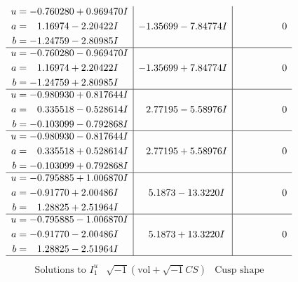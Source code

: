 \documentclass[1p]{elsarticle_modified}
\theoremstyle{definition}
\newcommand{\I}{\sqrt{-1}}
\begin{document}
$$\begin{array}{c|c|c}
\begin{aligned}
u &= -0.760280 + 0.969470 I \\
a &= \phantom{-}1.16974 - 2.20422 I \\
b &= -1.24759 - 2.80985 I\end{aligned}
 & -1.35699 - 7.84774 I & \phantom{-0.000000 } 0 \\ \hline\begin{aligned}
u &= -0.760280 - 0.969470 I \\
a &= \phantom{-}1.16974 + 2.20422 I \\
b &= -1.24759 + 2.80985 I\end{aligned}
 & -1.35699 + 7.84774 I & \phantom{-0.000000 } 0 \\ \hline\begin{aligned}
u &= -0.980930 + 0.817644 I \\
a &= \phantom{-}0.335518 - 0.528614 I \\
b &= -0.103099 - 0.792868 I\end{aligned}
 & \phantom{-}2.77195 - 5.58976 I & \phantom{-0.000000 } 0 \\ \hline\begin{aligned}
u &= -0.980930 - 0.817644 I \\
a &= \phantom{-}0.335518 + 0.528614 I \\
b &= -0.103099 + 0.792868 I\end{aligned}
 & \phantom{-}2.77195 + 5.58976 I & \phantom{-0.000000 } 0 \\ \hline\begin{aligned}
u &= -0.795885 + 1.006870 I \\
a &= -0.91770 + 2.00486 I \\
b &= \phantom{-}1.28825 + 2.51964 I\end{aligned}
 & \phantom{-}5.1873 - 13.3220 I & \phantom{-0.000000 } 0 \\ \hline\begin{aligned}
u &= -0.795885 - 1.006870 I \\
a &= -0.91770 - 2.00486 I \\
b &= \phantom{-}1.28825 - 2.51964 I\end{aligned}
 & \phantom{-}5.1873 + 13.3220 I & \phantom{-0.000000 } 0\\
 \hline 
 \end{array}$$\newpage$$\begin{array}{c|c|c}  
\text{Solutions to }I^u_{1}& \I (\text{vol} + \sqrt{-1}CS) & \text{Cusp shape}\\
 \hline 
\begin{aligned}

\end{aligned}
\end{array}$$
\end{document}
